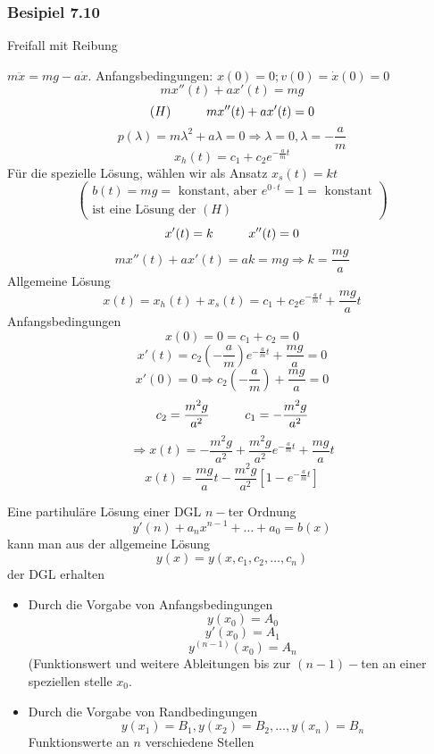 \begin{enumerate}
\subsubsection*{Besipiel 7.10}
Freifall mit Reibung 
\begin{center}
\end{center}
$m\ddot{x}=mg-a\dot{x}$. Anfangsbedingungen: $x(0)=0; v(0)=\dot{x}(0)=0$
$$mx''(t)+ax'(t)=mg$$
$$(H)\hspace{10mm}mx''(t)+ax'(t)=0$$
$$p(\lambda)=m\lambda^2+a\lambda=0\Rightarrow \lambda=0,\lambda=-\frac{a}{m}$$
$$x_h(t)=c_1+c_2e^{-\frac{a}{m}t}$$
Für die spezielle Lösung, wählen wir als Ansatz $x_s(t)=kt$
\[\left( \begin{array}{l}
b(t) = mg = {\text{ konstant, aber  }}{e^{0 \cdot t}} = 1 = {\text{ konstant}}\\
{\text{ist eine Lösung der }}(H)
\end{array} \right)\]
$$x'(t)=k\hspace{10mm}x''(t)=0$$
$$mx''(t)+ax'(t)=ak=mg\Rightarrow k=\frac{mg}{a}$$
Allgemeine Lösung 
$$x(t)=x_h(t)+x_s(t)=c_1+c_2e^{-\frac{a}{m}t}+\frac{mg}{a}t$$
Anfangsbedingungen
$$x(0)=0=c_1+c_2=0$$
$$x'(t)=c_2\left(-\frac{a}{m}\right)e^{-\frac{a}{m}t}+\frac{mg}{a}=0$$
$$x'(0)=0\Rightarrow c_2\left( -\frac{a}{m}\right) +\frac{mg}{a}=0$$
$$c_2=\frac{m^2g}{a^2}\hspace{10mm}c_1=-\frac{m^2g}{a^2}$$
$$\Rightarrow x(t)=-\frac{m^2g}{a^2}+\frac{m^2g}{a^2}e^{-\frac{a}{m}t}+\frac{mg}{a}t$$
$$x(t)=\frac{mg}{a}t-\frac{m^2g}{a^2}\left[ 1-e^{-\frac{a}{m}t}\right]$$
\end{enumerate}
Eine partihuläre Lösung einer DGL $n-$ter Ordnung $$y'{(n)}+a_nx^{n-1}+\dots+a_0=b(x)$$ kann man aus der allgemeine Lösung 
$$y(x)=y(x,c_1,c_2,\dots,c_n)$$ der DGL erhalten
\begin{itemize}
\item Durch die Vorgabe von Anfangsbedingungen 
$$y(x_0)=A_0$$
$$y'(x_0)=A_1$$
$$y^{(n-1)}(x_0)=A_n$$
(Funktionswert und weitere Ableitungen bis zur $(n-1)-$ten an einer speziellen stelle $x_0$.
\item Durch die Vorgabe von Randbedingungen 
$$y(x_1)=B_1, y(x_2)=B_2, \dots, y(x_n)=B_n$$ Funktionswerte an $n$ verschiedene Stellen
\end{itemize}
